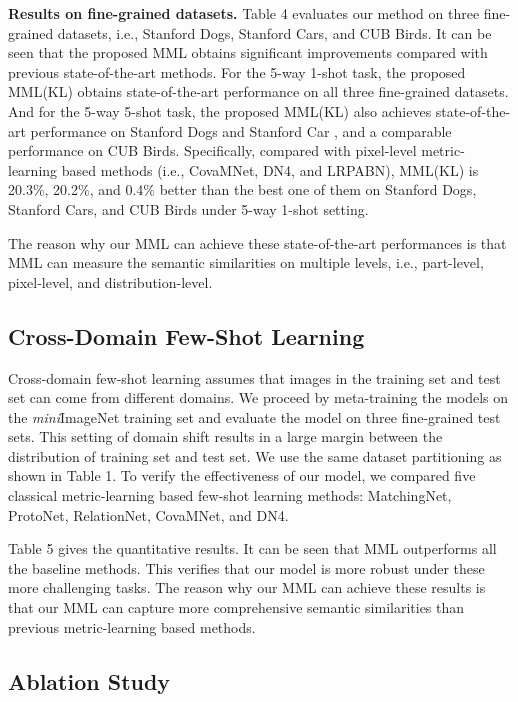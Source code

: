 \documentclass[10pt,twocolumn,letterpaper]{article}
\begin{document}
\textbf{Results on fine-grained datasets.}
Table 4 evaluates our method on three fine-grained datasets, i.e., Stanford Dogs, Stanford Cars, and CUB Birds. It can be seen that the proposed MML obtains significant improvements compared with previous state-of-the-art methods. For the 5-way 1-shot task, the proposed MML(KL) obtains state-of-the-art performance on all three fine-grained datasets. And for the 5-way 5-shot task, the proposed MML(KL) also achieves state-of-the-art performance on Stanford Dogs and Stanford Car , and a comparable performance on CUB Birds.
Specifically, compared with pixel-level metric-learning based methods (i.e., CovaMNet, DN4, and LRPABN), MML(KL) is 20.3\%, 20.2\%, and 0.4\% better than the best one of them on Stanford Dogs, Stanford Cars, and CUB Birds under 5-way 1-shot setting.

The reason why our MML can achieve these state-of-the-art performances is that MML can measure the semantic similarities on multiple levels, i.e., part-level, pixel-level, and distribution-level.



\subsection{Cross-Domain Few-Shot Learning}
Cross-domain few-shot learning assumes that images in the training set and test set can come from different domains. We proceed by meta-training the models on the \emph{mini}ImageNet training set and evaluate the model on three fine-grained test sets. This setting of domain shift results in a large margin between the distribution of training set and test set. We use the same dataset partitioning as shown in Table 1. 
To verify the effectiveness of our model, we compared five classical metric-learning based few-shot learning methods: MatchingNet, ProtoNet, RelationNet, CovaMNet, and DN4.

Table 5 gives the quantitative results. It can be seen that MML outperforms all the baseline methods. This verifies that our model is more robust under these more challenging tasks. The reason why our MML can achieve these results is that our MML can capture more comprehensive semantic similarities than previous metric-learning based methods. 
\subsection{Ablation Study}
\end{document}
